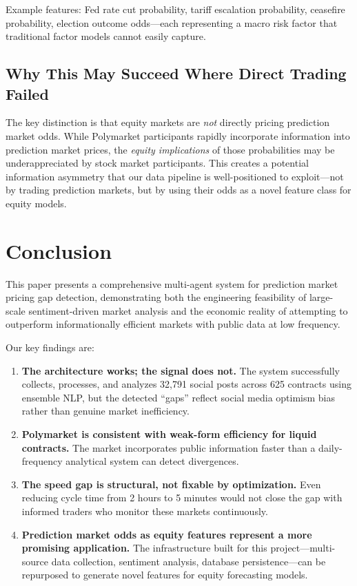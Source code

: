 \documentclass[12pt, letterpaper]{article}
\begin{document}
Example features: Fed rate cut probability, tariff escalation probability, ceasefire probability, election outcome odds---each representing a macro risk factor that traditional factor models cannot easily capture.

\subsection{Why This May Succeed Where Direct Trading Failed}

The key distinction is that equity markets are \textit{not} directly pricing prediction market odds. While Polymarket participants rapidly incorporate information into prediction market prices, the \textit{equity implications} of those probabilities may be underappreciated by stock market participants. This creates a potential information asymmetry that our data pipeline is well-positioned to exploit---not by trading prediction markets, but by using their odds as a novel feature class for equity models.

\section{Conclusion}

This paper presents a comprehensive multi-agent system for prediction market pricing gap detection, demonstrating both the engineering feasibility of large-scale sentiment-driven market analysis and the economic reality of attempting to outperform informationally efficient markets with public data at low frequency.

Our key findings are:

\begin{enumerate}
    \item \textbf{The architecture works; the signal does not.} The system successfully collects, processes, and analyzes 32,791 social posts across 625 contracts using ensemble NLP, but the detected ``gaps'' reflect social media optimism bias rather than genuine market inefficiency.

    \item \textbf{Polymarket is consistent with weak-form efficiency for liquid contracts.} The market incorporates public information faster than a daily-frequency analytical system can detect divergences.

    \item \textbf{The speed gap is structural, not fixable by optimization.} Even reducing cycle time from 2 hours to 5 minutes would not close the gap with informed traders who monitor these markets continuously.

    \item \textbf{Prediction market odds as equity features represent a more promising application.} The infrastructure built for this project---multi-source data collection, sentiment analysis, database persistence---can be repurposed to generate novel features for equity forecasting models.
\end{enumerate}
\end{document}
